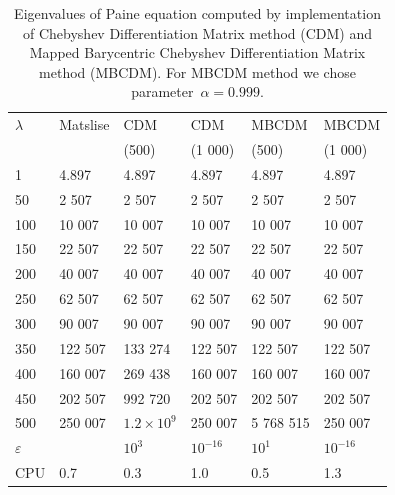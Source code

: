\documentclass[11pt,a4paper,oneside,openright]{report} %
\begin{document}
\begin{table}[H]
\centering
\caption{Eigenvalues of Paine equation computed by implementation of Chebyshev Differentiation Matrix method (CDM) and Mapped Barycentric Chebyshev Differentiation Matrix method (MBCDM). For MBCDM method we chose parameter~\hbox{$\alpha = 0.999$}.}
\label{}
{\small
\begin{tabularx}{\textwidth}{l *{5}{X}}
\toprule
$\lambda$ & Matslise & CDM   & CDM  & MBCDM  & MBCDM  \\
 &  & (500)  & (1 000) & (500) & (1 000) \\
\midrule
1 & 4.897 & 4.897 & 4.897 & 4.897 & 4.897 \\
50 & 2 507 & 2 507 & 2 507 & 2 507 & 2 507 \\
100 & 10 007 & 10 007 & 10 007 & 10 007 & 10 007 \\
150 & 22 507 & 22 507 & 22 507 & 22 507 & 22 507 \\
200 & 40 007 & 40 007 & 40 007 & 40 007 &  40 007 \\
250 & 62 507 & 62 507 & 62 507 & 62 507 &  62 507 \\
300 & 90 007 & 90 007 & 90 007 & 90 007 &  90 007 \\
350 & 122 507 & 133 274 & 122 507 & 122 507 &  122 507 \\
400 & 160 007 & 269 438 & 160 007 & 160 007 &  160 007 \\
450 & 202 507 & 992 720 & 202 507 & 202 507 &  202 507 \\
500 & 250 007 & $1.2 \times 10^{9}$ & 250 007 & 5 768 515 & 250 007  \\
\midrule
$\varepsilon$ &  & $10^{3}$ & $10^{-16}$ & $10^{1}$ & $10^{-16}$ \\
CPU & 0.7 & 0.3 & 1.0 & 0.5  &  1.3 \\
\bottomrule
\end{tabularx}
}
\end{table}
\end{document}
